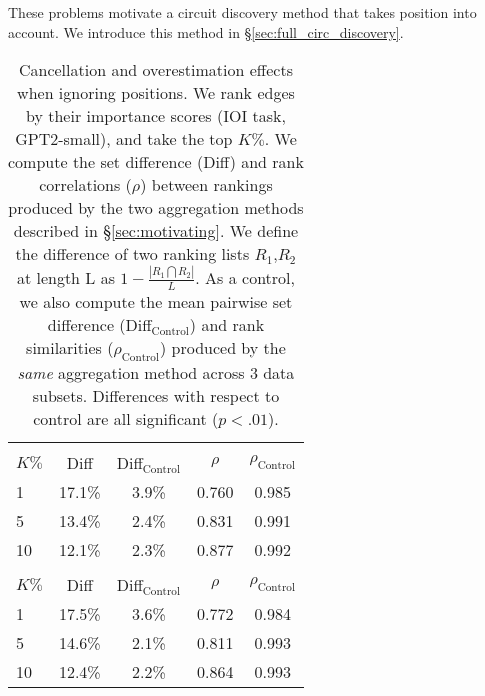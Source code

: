 These problems motivate a circuit discovery method that takes position into account. We introduce this method in \S\ref{sec:full_circ_discovery}. 


\begin{table}[t!]
\vspace{-10pt}
    \centering   
     \begin{tabular}{lcccc}
    \toprule
    \rowcolor{lightgray} \multicolumn{5}{c}{Cancellation} \\
    $K\%$ & Diff & Diff$_{\text{Control}}$ & $\rho$ & $\rho_{\text{Control}}$ \\
    \midrule
    1 & 17.1\% & 3.9\% & 0.760 & 0.985 \\
    5 & 13.4\% & 2.4\% & 0.831 & 0.991 \\
    10 & 12.1\% & 2.3\% & 0.877 & 0.992 \\
    \midrule
    \rowcolor{lightgray} \multicolumn{5}{c}{Overestimation} \\
    $K\%$ & Diff & Diff$_{\text{Control}}$ & $\rho$ & $\rho_{\text{Control}}$ \\
    \midrule
    1 & 17.5\% & 3.6\% & 0.772 & 0.984 \\
    5 & 14.6\% & 2.1\% & 0.811 & 0.993 \\
    10 & 12.4\% & 2.2\% & 0.864 & 0.993 \\
    \bottomrule
    \end{tabular}
   \caption{Cancellation and overestimation effects when ignoring positions. We rank edges by their importance scores (IOI task, GPT2-small), and take the top $K\%$. We compute the set difference (Diff) and rank correlations ($\rho$) between rankings produced by the two aggregation methods described in \S\ref{sec:motivating}. We define the difference of two ranking lists $R_1$,$R_2$ at length L as $1-\frac{|R_1 \bigcap R_2|}{L}$. As a control, we also compute the mean pairwise set difference (Diff$_\text{Control}$) and rank similarities ($\rho_\text{Control}$) produced by the \emph{same} aggregation method across 3 data subsets. Differences with respect to control are all significant ($p<.01$).
   }
    \label{tab:intersections}
    \vspace{-5pt}
\end{table}

